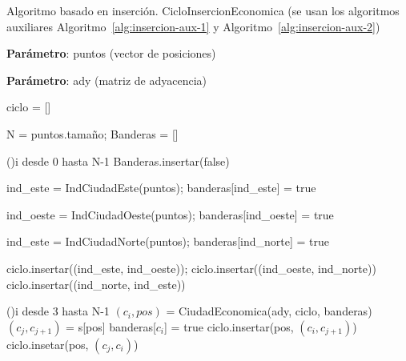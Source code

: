 \begin{algorithm}[H]
    \caption{Algoritmo basado en inserción. CicloInsercionEconomica (se usan los algoritmos 
    auxiliares Algoritmo~\ref{alg:insercion-aux-1} y Algoritmo~\ref{alg:insercion-aux-2})}\label{alg:insercion}
    \begin{minipage}{0.92\textwidth}
      \textbf{Parámetro}: puntos (vector de posiciones)
      
      \textbf{Parámetro}: ady (matriz de adyacencia)
    \end{minipage}

    ciclo = []\;

    N = puntos.tamaño;
    Banderas = []\;

    \For(){i desde 0 hasta N-1}{
      Banderas.insertar(false)
    }


    ind\_este = IndCiudadEste(puntos);
    banderas[ind\_este] = true\;

    ind\_oeste = IndCiudadOeste(puntos);
    banderas[ind\_oeste] = true\;

    ind\_este = IndCiudadNorte(puntos);
    banderas[ind\_norte] = true\;


    ciclo.insertar((ind\_este, ind\_oeste));
    ciclo.insertar((ind\_oeste, ind\_norte))\;
    ciclo.insertar((ind\_norte, ind\_este))\;


    \For(){i desde 3 hasta N-1}{
      $(c_i,pos)$ = CiudadEconomica(ady, ciclo, banderas)\;
      $(c_j, c_{j+1})$ = s[pos]\;
      banderas[$c_i$] = true\;
      ciclo.insertar(pos, $(c_i,c_{j+1})$)\;
      ciclo.insetar(pos, $(c_j,c_i)$)\;
    }
\end{algorithm}

